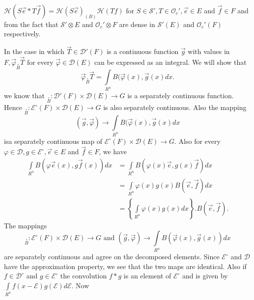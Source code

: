 \noindent $\mathscr{H} (S \overrightarrow{e} * T \overrightarrow{f}) =
\mathscr{H}(S \overrightarrow{e})_{(B)} \mathscr{H}(T f)$ for $S \in
\mathscr{S}', T \in \mathscr{O}_c', \overrightarrow{e} \in E$ and
$\overrightarrow{f} \in F$ and from the fact that $\mathscr{S}'
\otimes E$ and $\mathscr{O}_c' \otimes F$ are dense in
$\mathscr{S}'(E)$ and $\mathscr{O}_c'(F)$ respectively.

In the case in which $\overrightarrow{T} \in \mathscr{D}'(F)$ is a
continuous function $\overrightarrow{g}$ with values in $F,
\overrightarrow{\varphi}\underset{B}{.} \overrightarrow{T}$ for
every $\overrightarrow{\varphi} \in \mathscr{D}(E)$ can be expressed
as an integral. We will show that 
$$
\overrightarrow{\varphi}\underset{B}{.} \overrightarrow{T} =
\int\limits_{R^n} B(\overrightarrow{\varphi}(x), \overrightarrow{g}(x)
dx.
$$
we know that $\underset{B}{.} :\mathscr{D}'(F) \times
\mathscr{D}(E) \to G$ is a separately continuous function. Hence
$\underset{B}{.} : \mathcal{E}^\circ (F) \times \mathscr{D}(E)
\to G$ is also separately continuous. Also the mapping
$$
(\overrightarrow{g}, \overrightarrow{\varphi}) \to \int\limits_{R^n}
B(\overrightarrow{\varphi} (x), \overrightarrow{g}(x) dx
$$
is\pageoriginale a separately continuous map of $\mathcal{E}^\circ(F)
\times \mathscr{D}(E) \to G$. Also for every $\varphi \in \mathscr{D},
g \in \mathcal{E}^\circ , \overrightarrow{e} \in E$ and
$\overrightarrow{f} \in F$, we have 
\begin{align*}
\int\limits_{R^n} B(\varphi \overrightarrow{e} (x), g
\overrightarrow{f} (x)) dx &= \int\limits_{R^n} B(\varphi (x)
\overrightarrow{e}, g(x) \overrightarrow{f}) dx\\
&= \int\limits_{R^n} \varphi(x) g(x) B (\overrightarrow{e},
\overrightarrow{f}) dx\\
&=\left\{ \int\limits_{R^n} \varphi(x) g(x) dx \right\}. B
  (\overrightarrow{e}, \overrightarrow{f}).
\end{align*}
The mappings 
$$\underset{B}{.} : \mathcal{E}^\circ(F) \times
  \mathscr{D}(E) \to G \text{ and } (\overrightarrow{g},
  \overrightarrow{\varphi}) \to \int\limits_{R^n}
  B(\overrightarrow{\varphi}(x), \overrightarrow{g}(x)) dx$$ are
  separately continuous and agree on the decomposed elements. Since
  $\mathcal{E}^\circ$ and $\mathscr{D}$ have the approximation
  property, we see that the two maps are identical. Also if $f \in
  \mathscr{D}^\circ$ and $g \in \mathcal{E}^\circ$ the convolution $f
  * g$ is an element of $\mathcal{E}^\circ$ and is given by
  $\int\limits_{R^n} f(x-\mathscr{E}) g(\mathscr{E})d\mathscr{E}$. Now
